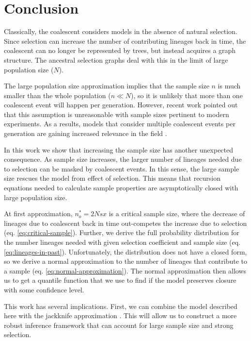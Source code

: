 \documentclass[review]{elsarticle}
\begin{document}
\section{Conclusion}
\label{sec:conclusion}

Classically, the coalescent considers models in the absence of natural selection. Since selection
can increase the number of contributing lineages back in time, the coalescent can no longer be
represented by trees, but instead acquires a graph structure. The ancestral selection graphs
\citep{KroneNeuhauser1997} deal with this in the limit of large population size ($N$).

The large population size approximation implies that the sample size $n$ is much smaller than the
whole population ($n \ll N$), so it is unlikely that more than one coalescent event will happen per
generation. However, recent work \citep{BhaskarEtAl2014,NelsonEtAl2019} pointed out that this
assumption is unreasonable with sample sizes pertinent to modern experiments. As a results, models
that consider multiple coalescent events per generation are gaining increased relevance in the
field \citep{FlemmingtonVoit}.

In this work we show that increasing the sample size has another unexpected consequence. As sample
size increases, the larger number of lineages needed due to selection can be masked by coalescent
events. In this sense, the large sample size rescues the model from effect of selection. This means
that recursion equations needed to calculate sample properties are asymptotically closed with large
population size.

At first approximation, $n_o^*=2Nsx$ is a critical sample size, where the decrease of lineages due to
coalescent back in time out-competes the increase due to selection (eq. \eqref{eq:critical-sample}).
Further, we derive the full probability distribution for the number lineages needed with given
selection coefficient and sample size (eq. \eqref{eq:lineages-in-past}). Unfortunately, the
distribution does not have a closed form, so we derive a normal approximation to the number of
lineages that contribute to a sample (eq. \eqref{eq:normal-approximation}). The normal approximation
then allows us to get a quantile function that we use to find if the model preserves closure with
some confidence level.

This work has several implications. First, we can combine the model described here with the
jackknife approximation \citep{JouganousEtAl2017}. This will allow us to construct a more robust
inference framework that can account for large sample size and strong selection.
\end{document}
